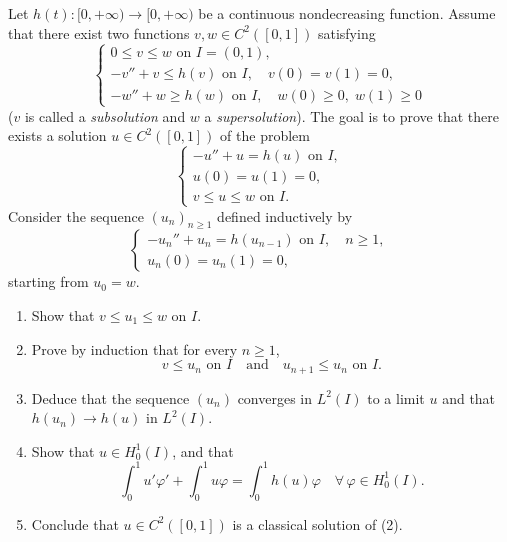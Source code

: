 \documentclass[12pt]{article}
\begin{document}
Let $h(t) : [0,+\infty) \to [0,+\infty)$ be a continuous nondecreasing function.
Assume that there exist two functions $v, w \in C^2([0,1])$ satisfying
\begin{equation}\tag{1}
\begin{cases}
0 \le v \le w \text{ on } I = (0,1),\\
-v'' + v \le h(v) \text{ on } I,\quad v(0) = v(1) = 0,\\
-w'' + w \ge h(w) \text{ on } I,\quad w(0) \ge 0,\; w(1) \ge 0
\end{cases}
\end{equation}
($v$ is called a \emph{subsolution} and $w$ a \emph{supersolution}). The goal is to prove that there
exists a solution $u \in C^2([0,1])$ of the problem
\begin{equation}\tag{2}
\begin{cases}
-u'' + u = h(u) \text{ on } I,\\
u(0) = u(1) = 0,\\
v \le u \le w \text{ on } I.
\end{cases}
\end{equation}
Consider the sequence $(u_n)_{n \ge 1}$ defined inductively by
\begin{equation}\tag{3}
\begin{cases}
-u_n'' + u_n = h(u_{n-1}) \text{ on } I,\quad n \ge 1,\\
u_n(0) = u_n(1) = 0,
\end{cases}
\end{equation}
starting from $u_0 = w$.
 
\begin{enumerate}
\item Show that $v \le u_1 \le w$ on $I$.
 
 
\item Prove by induction that for every $n \ge 1$,
\[
v \le u_n \text{ on } I \quad \text{and} \quad u_{n+1} \le u_n \text{ on } I.
\]
 
\item Deduce that the sequence $(u_n)$ converges in $L^2(I)$ to a limit $u$ and that
$h(u_n) \to h(u)$ in $L^2(I)$.
 
\item Show that $u \in H^1_0(I)$, and that
\[
\int_0^1 u'\varphi' + \int_0^1 u\varphi = \int_0^1 h(u)\varphi \quad \forall\, \varphi \in H^1_0(I).
\]
 
\item Conclude that $u \in C^2([0,1])$ is a classical solution of (2).
\end{enumerate}
 
\end{document}
